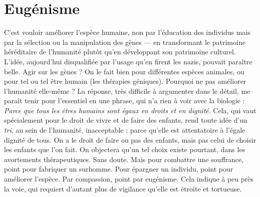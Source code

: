 \section{Eugénisme}
C’est vouloir améliorer l'espèce humaine, non par l’éducation
des individus mais par la sélection ou la manipulation
des gènes — en transformant le patrimoine héréditaire de l’humanité plutôt
qu'en développant son patrimoine culturel. L'idée, aujourd’hui disqualifiée par
l'usage qu’en firent les nazis, pouvait paraître belle. Agir sur les gènes ? On le
fait bien pour différentes espèces animales, ou pour tel ou tel être humain (les
thérapies géniques). Pourquoi ne pas améliorer l'humanité elle-même ? La
réponse, très difficile à argumenter dans le détail, me paraît tenir pour l’essentiel
en une phrase, qui n’a rien à voir avec la biologie : {\it Parce que tous les êtres
humains sont égaux en droits et en dignité}. Cela, qui vaut spécialement pour le
droit de vivre et de faire des enfants, rend toute idée d’un {\it tri}, au sein de
l'humanité, inacceptable : parce qu’elle est attentatoire à l’égale dignité de tous.
On a le droit de faire ou pas des enfants, mais pas celui de choisir les enfants
que l’on fait. On objectera qu’un tel choix existe pourtant, dans les avortements
thérapeutiques. Sans doute. Mais pour combattre une souffrance,
point pour fabriquer un surhomme. Pour épargner un individu, point pour
améliorer l'espèce. Par compassion, point par eugénisme. Cela indique à peu
près la voie, qui requiert d’autant plus de vigilance qu’elle est étroite et tortueuse.


